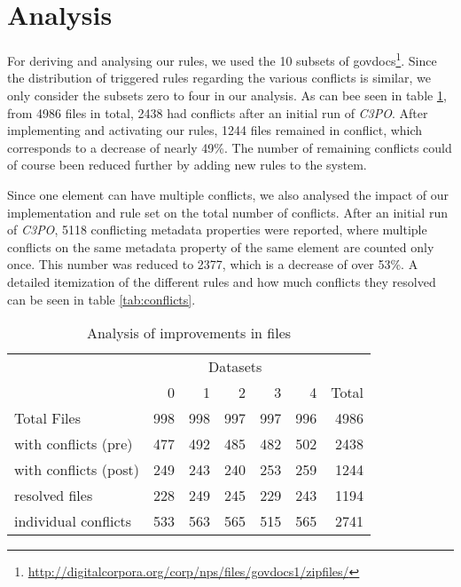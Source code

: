 \documentclass[a4paper,12pt]{article}
\begin{document}
\section{Analysis}

For deriving and analysing our rules, we used the 10 subsets of govdocs\footnote{\url{http://digitalcorpora.org/corp/nps/files/govdocs1/zipfiles/}}.
Since the distribution of triggered rules regarding the various conflicts is similar, we only consider the subsets zero to four in our analysis.
As can bee seen in table \ref{tab:files}, from 4986 files in total, 2438 had conflicts after an initial run of \emph{C3PO}. After implementing and activating our rules, 1244 files remained in conflict, which corresponds to a decrease of nearly 49\%. The number of remaining conflicts could of course been reduced further by adding new rules to the system.

Since one element can have multiple conflicts, we also analysed the impact of our implementation and rule set on the total number of conflicts.
After an initial run of \emph{C3PO}, 5118 conflicting metadata properties were reported, where multiple conflicts on the same metadata property of the same element are counted only once. This number was reduced to 2377, which is a decrease of over 53\%.
A detailed itemization of the different rules and how much conflicts they resolved can be seen in table \ref{tab:conflicts}.

\begin{table}[ht]
\begin{center}

\begin{tabular}[h]{l||r|r|r|r|r||r}
 &  \multicolumn{5}{c}{Datasets} \\
        & 0 & 1 & 2 & 3 & 4 & Total \\
\hline
Total Files & 998 & 998 & 997 & 997 & 996 & 4986\\ 
\hline
with conflicts (pre) & 477 &	492 & 485 & 482	& 502 &	2438\\ 
with conflicts (post) & 249	& 243 &	240 & 253 &	259 & 1244\\
\hline
resolved files & 228 & 249 & 245 & 229 & 243 & 1194 \\
individual conflicts & 533 & 563 & 565 & 515 & 565 & 2741 \\


\end{tabular}
\end{center}
\caption{Analysis of improvements in files}
\label{tab:files}
\end{table}
\end{document}
